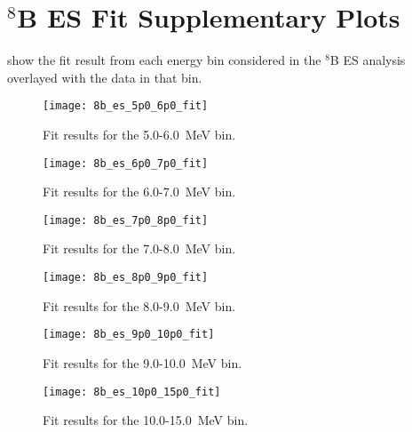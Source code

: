 \chapter{\texorpdfstring{{\snop} $^8$B}{SNO+ Boron-8} ES Fit Supplementary Plots}
\label{chap:solar_bins}

 show the fit result from each energy bin considered in the {\snop} $^8$B ES analysis overlayed with the data in that bin.

\begin{figure}
\centering
\texttt{[image: 8b\_es\_5p0\_6p0\_fit]}
\caption{\label{fig:56}Fit results for the 5.0-6.0~MeV bin.}
\end{figure}

\begin{figure}
\centering
\texttt{[image: 8b\_es\_6p0\_7p0\_fit]}
\caption{\label{fig:67}Fit results for the 6.0-7.0~MeV bin.}
\end{figure}

\begin{figure}
\centering
\texttt{[image: 8b\_es\_7p0\_8p0\_fit]}
\caption{\label{fig:78}Fit results for the 7.0-8.0~MeV bin.}
\end{figure}

\begin{figure}
\centering
\texttt{[image: 8b\_es\_8p0\_9p0\_fit]}
\caption{\label{fig:89}Fit results for the 8.0-9.0~MeV bin.}
\end{figure}

\begin{figure}
\centering
\texttt{[image: 8b\_es\_9p0\_10p0\_fit]}
\caption{\label{fig:910}Fit results for the 9.0-10.0~MeV bin.}
\end{figure}

\begin{figure}
\centering
\texttt{[image: 8b\_es\_10p0\_15p0\_fit]}
\caption{\label{fig:1015}Fit results for the 10.0-15.0~MeV bin.}
\end{figure}


\clearpage
